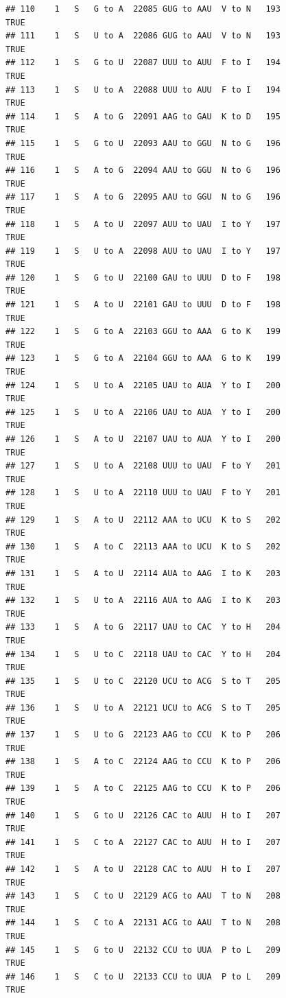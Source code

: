 \documentclass[
  12pt,
]{article}
\begin{document}
\begin{verbatim}
## 110    1   S   G to A  22085 GUG to AAU  V to N   193           TRUE
## 111    1   S   U to A  22086 GUG to AAU  V to N   193           TRUE
## 112    1   S   G to U  22087 UUU to AUU  F to I   194           TRUE
## 113    1   S   U to A  22088 UUU to AUU  F to I   194           TRUE
## 114    1   S   A to G  22091 AAG to GAU  K to D   195           TRUE
## 115    1   S   G to U  22093 AAU to GGU  N to G   196           TRUE
## 116    1   S   A to G  22094 AAU to GGU  N to G   196           TRUE
## 117    1   S   A to G  22095 AAU to GGU  N to G   196           TRUE
## 118    1   S   A to U  22097 AUU to UAU  I to Y   197           TRUE
## 119    1   S   U to A  22098 AUU to UAU  I to Y   197           TRUE
## 120    1   S   G to U  22100 GAU to UUU  D to F   198           TRUE
## 121    1   S   A to U  22101 GAU to UUU  D to F   198           TRUE
## 122    1   S   G to A  22103 GGU to AAA  G to K   199           TRUE
## 123    1   S   G to A  22104 GGU to AAA  G to K   199           TRUE
## 124    1   S   U to A  22105 UAU to AUA  Y to I   200           TRUE
## 125    1   S   U to A  22106 UAU to AUA  Y to I   200           TRUE
## 126    1   S   A to U  22107 UAU to AUA  Y to I   200           TRUE
## 127    1   S   U to A  22108 UUU to UAU  F to Y   201           TRUE
## 128    1   S   U to A  22110 UUU to UAU  F to Y   201           TRUE
## 129    1   S   A to U  22112 AAA to UCU  K to S   202           TRUE
## 130    1   S   A to C  22113 AAA to UCU  K to S   202           TRUE
## 131    1   S   A to U  22114 AUA to AAG  I to K   203           TRUE
## 132    1   S   U to A  22116 AUA to AAG  I to K   203           TRUE
## 133    1   S   A to G  22117 UAU to CAC  Y to H   204           TRUE
## 134    1   S   U to C  22118 UAU to CAC  Y to H   204           TRUE
## 135    1   S   U to C  22120 UCU to ACG  S to T   205           TRUE
## 136    1   S   U to A  22121 UCU to ACG  S to T   205           TRUE
## 137    1   S   U to G  22123 AAG to CCU  K to P   206           TRUE
## 138    1   S   A to C  22124 AAG to CCU  K to P   206           TRUE
## 139    1   S   A to C  22125 AAG to CCU  K to P   206           TRUE
## 140    1   S   G to U  22126 CAC to AUU  H to I   207           TRUE
## 141    1   S   C to A  22127 CAC to AUU  H to I   207           TRUE
## 142    1   S   A to U  22128 CAC to AUU  H to I   207           TRUE
## 143    1   S   C to U  22129 ACG to AAU  T to N   208           TRUE
## 144    1   S   C to A  22131 ACG to AAU  T to N   208           TRUE
## 145    1   S   G to U  22132 CCU to UUA  P to L   209           TRUE
## 146    1   S   C to U  22133 CCU to UUA  P to L   209           TRUE

\end{verbatim}
\end{document}
